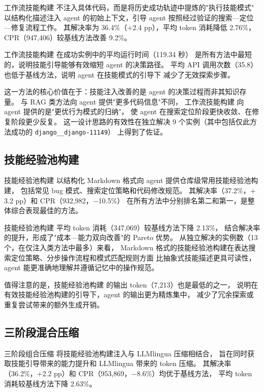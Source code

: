工作流技能构建 不注入具体代码，而是将历史成功轨迹中提炼的"执行技能模式"
以结构化描述注入 agent 的初始上下文，引导 agent 按照经过验证的搜索—定位—修复流程工作。
其解决率为 36.4\%（$+$2.4 pp），平均 token 消耗降低 2.76\%，
CPR（947,406）较基线方法改善 9.2\%。

工作流技能构建 在成功实例中的平均运行时间（119.34 秒）
是所有方法中最短的，说明技能引导能够有效缩短 agent 的决策路径。
平均 API 调用次数（35.8）也低于基线方法，说明 agent 在技能模式的引导下
减少了无效探索步骤。

这一方法的核心价值在于：技能注入改善的是 agent 的决策过程而非其知识存量。
与 RAG 类方法向 agent 提供"更多代码信息"不同，
工作流技能构建 向 agent 提供的是"更优行为模式的归纳"，
使 agent 在搜索定位阶段更快收敛、在修复阶段更少反复。
这一设计思路的有效性在独立解决 9 个实例（其中包括仅此方法成功的 \texttt{django\_\_django-11149}）
上得到了佐证。

\subsection{技能经验池构建}
\label{subsec:analysis-skill-memory}

技能经验池构建 以结构化 Markdown 格式向 agent 提供仓库级常用技能经验池构建，
包括常见 bug 模式、搜索定位策略和代码修改规范。
其解决率（37.2\%，$+$3.2 pp）和 CPR（932,982，$-$10.5\%）
在所有方法中分别排名第二和第一，是整体综合表现最佳的方法。

技能经验池构建 平均 token 消耗（347,069）较基线方法下降 2.13\%，
结合解决率的提升，形成了"成本—能力双向改善"的 Pareto 优势。
从独立解决的实例数（13 个，在仅注入类方法中最多）来看，
Markdown 格式的技能经验池构建在表达搜索定位策略、分步操作流程和模式匹配规则方面
比抽象式技能描述更具可读性，agent 能更准确地理解并遵循记忆中的操作规范。

值得注意的是，技能经验池构建 的输出 token（7,213）也是最低的之一，
说明在有效技能经验池构建的引导下，agent 的输出更为精炼集中，
减少了冗余探索或重复尝试带来的额外生成开销。

\subsection{三阶段混合压缩}
\label{subsec:analysis-hybrid}

三阶段组合压缩 将技能经验池构建注入与 LLMlingua 压缩相结合，
旨在同时获取技能引导带来的能力提升和 LLMlingua 带来的 token 压缩。
其解决率（36.2\%，$+$2.2 pp）和 CPR（953,869，$-$8.6\%）均优于基线方法，
平均 token 消耗较基线方法下降 2.63\%。

